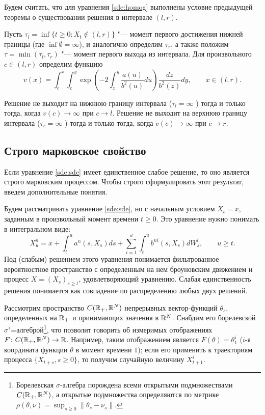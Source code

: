 Будем считать, что для уравнения \eqref{sde:homog} выполнены условие предыдущей теоремы о существовании решения в интервале $(l,r)$.

Пусть $\tau_l = \inf\{t\ge 0: X_t \notin(l,r)\}$ "--- момент первого достижения нижней границы (где $\inf\emptyset = \infty$), и аналогично определим $\tau_r$, а также положим $\tau = \min(\tau_l,\tau_r)$ "--- момент первого выхода из интервала.
Для произвольного $c\in(l,r)$ определим функцию
\[
v(x) = \int_c^x \int_c^y \exp\left(-2\int_z^y \frac{a(u)}{b^2(u)} du \right)\frac{dz}{b^2(z)} dy, \qquad x \in(l,r).
\]

\begin{theorem}[У.~Феллер]
\label{sde:t:feller}
Решение не выходит на нижнюю границу интервала ($\tau_l=\infty$ \as) тогда и только тогда, когда $v(c) \to \infty$ при $c\to l$.
Решение не выходит на верхнюю границу интервала ($\tau_r=\infty$ \as) тогда и только тогда, когда $v(c)\to \infty$ при $c\to r$.
\end{theorem}


\subsection{Строго марковское свойство}

Если уравнение \eqref{sde:sde} имеет единственное слабое решение, то оно является строго марковским процессом.
Чтобы строго сформулировать этот результат, введем дополнительные понятия.

Будем рассматривать уравнение \eqref{sde:sde}, но с начальным условием $X_{t}=x$, заданным в произвольный момент времени $t\ge 0$.
Это уравнение нужно понимать в интегральном виде:
\begin{equation}
\label{sde:sde-markov}
X_u^n = x + \int_{t}^u a^n(s,X_s)ds + \sum_{i=1}^d \int_{t}^u b^{ni}(s,X_s) dW_s^i, \qquad u\ge t.
\end{equation}
Под (слабым) решением этого уравнения понимается фильтрованное вероятностное пространство с определенным на нем броуновским движением и процесс $X=(X_s)_{s\ge t}$, удовлетворяющий уравнению.
Слабая единственность решения понимается как совпадение по распределению любых двух решений.

Рассмотрим пространство $C(\mathbb{R}_+,\mathbb{R}^N)$ непрерывных вектор-функций $\theta_s$, определенных на $\mathbb{R}_+$ и принимающих значения в $\mathbb{R}^N$.
Снабдим его борелевской $\sigma$"=алгеброй\footnote{Борелевская $\sigma$-алгебра порождена всеми открытыми подмножествами $C(\mathbb{R}_+,\mathbb{R}^N)$, а открытые подмножества определяются по метрике $\rho(\theta,\nu) = \sup_{s\ge 0} \|\theta_s-\nu_s\|$.}, что позволит говорить об измеримых отображениях $F\colon C(\mathbb{R}_+,\mathbb{R}^N) \to \mathbb{R}$.
Например, таким отображением является $F(\theta) = \theta_1^i$ ($i$-я координата функции $\theta$ в момент времени $1$); если его применить к траекториям процесса $\{X_{t+s}, s\ge 0\}$, то получим случайную величину $X_{t+1}^i$.

